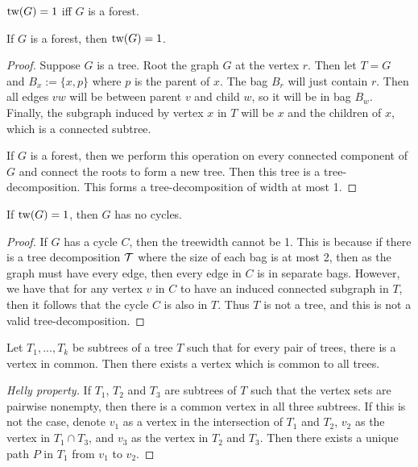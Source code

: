 \begin{example}\label{ex:treewidth_forest}
	$\text{tw}(G) = 1$ iff $G$ is a forest.
	\begin{lemma}
		If $G$ is a forest, then $\text{tw}(G) = 1$.
	\end{lemma}
	\begin{proof}
		Suppose $G$ is a tree. Root the graph $G$ at the vertex $r$. Then let $T = G$ and $B_x:= \lbrace x, p \rbrace$ where $p$ is the parent of $x$. The bag $B_r$ will just contain $r$. Then all edges $vw$ will be between parent $v$ and child $w$, so it will be in bag $B_w$. Finally, the subgraph induced by vertex $x$ in $T$ will be $x$ and the children of $x$, which is a connected subtree.
		
		If $G$ is a forest, then we perform this operation on every connected component of $G$ and connect the roots to form a new tree. Then this tree is a tree-decomposition. This forms a tree-decomposition of width at most 1. 
		
		
	\end{proof}
	\begin{lemma}
		If $\text{tw}(G) = 1$, then $G$ has no cycles.
	\end{lemma}
	\begin{proof}
		If $G$ has a cycle $C$, then the treewidth cannot be 1. This is because if there is a tree decomposition $\mathcal{T}$ where the size of each bag is at most 2, then as the graph must have every edge, then every edge in $C$ is in separate bags. However, we have that for any vertex $v$ in $C$ to have an induced connected subgraph in $T$, then it follows that the cycle $C$ is also in $T$. Thus $T$ is not a tree, and this is not a valid tree-decomposition. 
	\end{proof}
\end{example}

\begin{lemma}\label{lem:Helly}
	Let $T_1, ..., T_k$ be subtrees of a tree $T$ such that for every pair of trees, there is a vertex in common. Then there exists a vertex which is common to all trees.
\end{lemma}
\begin{proof}[Helly property]
	If $T_1$, $T_2$ and $T_3$ are subtrees of $T$ such that the vertex sets are pairwise nonempty, then there is a common vertex in all three subtrees. If this is not the case, denote $v_1$ as a vertex in the intersection of $T_1$ and $T_2$, $v_2$ as the vertex in $T_1 \cap T_3$, and $v_3$ as the vertex in $T_2$ and $T_3$. Then there exists a unique path $P$ in $T_1$ from $v_1$ to $v_2$.
\end{proof}

